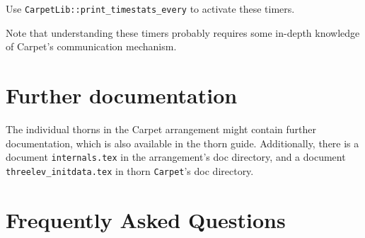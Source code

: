 Use {\tt CarpetLib::print\_timestats\_every} to activate these timers.

Note that understanding  these timers probably requires some in-depth
knowledge of Carpet's communication mechanism.


\section{Further documentation}

The individual thorns in the Carpet arrangement might contain further
documentation, which is also available in the thorn guide.
Additionally, there is a document \texttt{internals.tex} in the
arrangement's doc directory, and a document
\texttt{threelev\_initdata.tex} in thorn \texttt{Carpet}'s doc
directory.


\section{Frequently Asked Questions}
\label{sec:faq}

